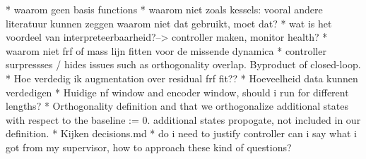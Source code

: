 \begin{wip}
* waarom geen basis functions
* waarom niet zoals kessels: vooral andere literatuur kunnen zeggen waarom niet dat gebruikt, moet dat?
* wat is het voordeel van interpreteerbaarheid?--> controller maken, monitor health?
* waarom niet frf of mass lijn fitten voor de missende dynamica
* controller surpressses / hides issues such as orthogonality overlap. Byproduct of closed-loop.
* Hoe verdedig ik augmentation over residual frf fit??
* Hoeveelheid data kunnen verdedigen
* Huidige nf window and encoder window, should i run for different lengths?
* Orthogonality definition and that we orthogonalize additional states with respect to the baseline := 0. additional states propogate, not included in our definition.
* Kijken decisions.md
* do i need to justify controller can i say what i got from my supervisor, how to approach these kind of questions?
\end{wip}
